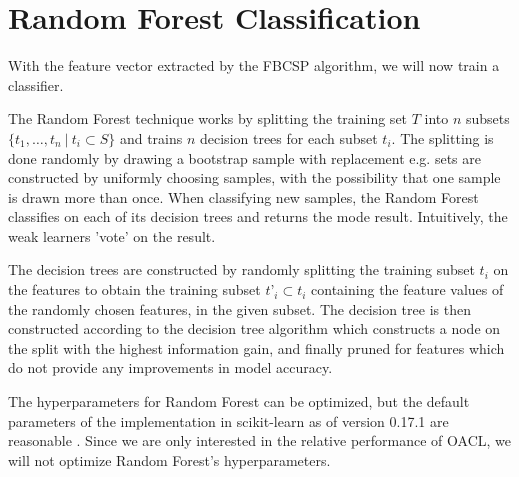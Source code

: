 \section{Random Forest Classification}\label{sec:randomforest}
With the feature vector extracted by the FBCSP algorithm, we will now train a classifier.

The Random Forest technique works by splitting the training set $T$ into $n$ subsets $\{t_1,…,t_n \ | \ t_i \subset S\}$ and trains $n$ decision trees for each subset $t_i$. The splitting is done randomly by drawing a bootstrap sample with replacement e.g. sets are constructed by uniformly choosing samples, with the possibility that one sample is drawn more than once. When classifying new samples, the Random Forest classifies on each of its decision trees and returns the mode result. Intuitively, the weak learners 'vote' on the result.

The decision trees are constructed by randomly splitting the training subset $t_i$ on the features to obtain the training subset $t’_i \subset t_i$ containing the feature values of the randomly chosen features, in the given subset. The decision tree is then constructed according to the decision tree algorithm which constructs a node on the split with the highest information gain, and finally pruned for features which do not provide any improvements in model accuracy.

The hyperparameters for Random Forest can be optimized, but the default parameters of the implementation in scikit-learn \citep{scikit-learn} as of version 0.17.1 are reasonable \citep{bernard2009influence}. Since we are only interested in the relative performance of OACL, we will not optimize Random Forest's hyperparameters.